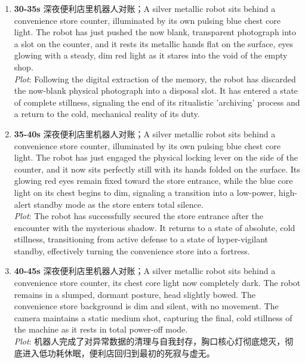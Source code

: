 \documentclass[11pt,a4paper]{article}
\begin{document}
\begin{enumerate}
\item \textbf{30-35s} 深夜便利店里机器人对账；A silver metallic robot sits behind a convenience store counter, illuminated by its own pulsing blue chest core light. The robot has just pushed the now blank, transparent photograph into a slot on the counter, and it rests its metallic hands flat on the surface, eyes glowing with a steady, dim red light as it stares into the void of the empty shop.\\\newline \textit{Plot}: Following the digital extraction of the memory, the robot has discarded the now-blank physical photograph into a disposal slot. It has entered a state of complete stillness, signaling the end of its ritualistic 'archiving' process and a return to the cold, mechanical reality of its duty.
\item \textbf{35-40s} 深夜便利店里机器人对账；A silver metallic robot sits behind a convenience store counter, illuminated by its own pulsing blue chest core light. The robot has just engaged the physical locking lever on the side of the counter, and it now sits perfectly still with its hands folded on the surface. Its glowing red eyes remain fixed toward the store entrance, while the blue core light on its chest begins to dim, signaling a transition into a low-power, high-alert standby mode as the store enters total silence.\\\newline \textit{Plot}: The robot has successfully secured the store entrance after the encounter with the mysterious shadow. It returns to a state of absolute, cold stillness, transitioning from active defense to a state of hyper-vigilant standby, effectively turning the convenience store into a fortress.
\item \textbf{40-45s} 深夜便利店里机器人对账；A silver metallic robot sits behind a convenience store counter, its chest core light now completely dark. The robot remains in a slumped, dormant posture, head slightly bowed. The convenience store background is dim and silent, with no movement. The camera maintains a static medium shot, capturing the final, cold stillness of the machine as it rests in total power-off mode.\\\newline \textit{Plot}: 机器人完成了对异常数据的清理与自我封存，胸口核心灯彻底熄灭，彻底进入低功耗休眠，便利店回归到最初的死寂与虚无。

\end{enumerate}
\end{document}
